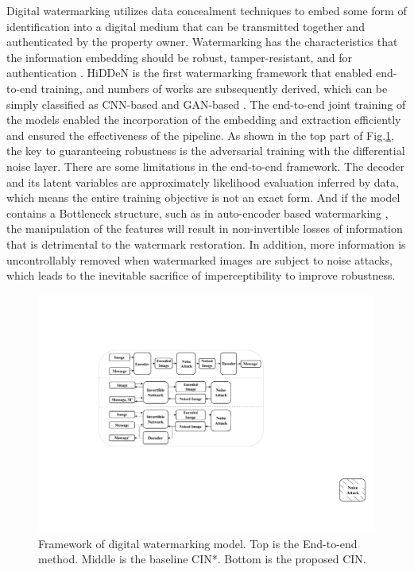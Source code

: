 \documentclass[sigconf]{acmart}
\begin{document}
Digital watermarking utilizes data concealment techniques to embed some form of identification into a digital medium that can be transmitted together and authenticated by the property owner. Watermarking has the characteristics that the information embedding should be robust, tamper-resistant, and for authentication \cite{zhang2021brief,byrnes2021data}. 
HiDDeN \cite{zhu2018hidden} is the first watermarking framework that enabled end-to-end training, and numbers of works are subsequently derived, which can be simply classified as CNN-based \cite{mun2019finding,zhu2018hidden,liu2019novel,jia2021mbrs,wen2019romark} and GAN-based \cite{zhang2020robust,zhang2019steganogan,yu2020attention}. The end-to-end joint training of the models enabled the incorporation of the embedding and extraction efficiently and ensured the effectiveness of the pipeline.
As shown in the top part of Fig.\ref{fig:intr contrast framework}, the key to guaranteeing robustness is the adversarial training with the differential noise layer. There are some limitations in the end-to-end framework. The decoder and its latent variables are approximately likelihood evaluation inferred by data, which means the entire training objective is not an exact form. And if the model contains a Bottleneck structure, such as in auto-encoder based watermarking \cite{kandi2017exploring}, the manipulation of the features will result in non-invertible losses of information that is detrimental to the watermark restoration. In addition, more information is uncontrollably removed when watermarked images are subject to noise attacks, which leads to the inevitable sacrifice of imperceptibility to improve robustness.

\begin{figure}[]
    \centering
    \includegraphics[width=0.8\linewidth]{picture/intra_figure.pdf}
    \caption{Framework of digital watermarking model. Top is the End-to-end  method. Middle is the baseline CIN*. Bottom is the proposed CIN.}
    \label{fig:intr contrast framework}
\end{figure}
\end{document}

